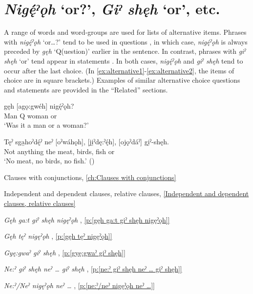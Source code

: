\section{\textit{Nigę́ˀǫh} ‘or?’, \textit{Giˀ shęh} ‘or’, etc.}\label{ch:[nigę́ˀǫh] ‘or?’, [giˀ shęh] ‘or’, etc}
A range of words and word-groups are used for lists of alternative items. Phrases with \textit{nigę́ˀǫh} ‘or…?’ tend to be used in questions , in which case, \textit{nigę́ˀǫh} is always preceded by \textit{gęh} ‘Q(uestion)’ earlier in the sentence. In contrast, phrases with \textit{giˀ shęh} ‘or’ tend appear in statements . In both cases, \textit{nigę́ˀǫh} and \textit{giˀ shęh} tend to occur after the last choice. (In \ref{ex:alternative1}-\ref{ex:alternative2}, the items of choice are in square brackets.) Examples of similar alternative choice questions and statements are provided in the “Related” sections.

\ea\label{ex:alternative1}
\gll [Hǫ:gwéh] gęh [agǫ:gwéh] nigę́ˀǫh? \\
Man Q woman or\\
\glt ‘Was it a man or a woman?’
\z

\ea\label{ex:alternative2}
\gll Tęˀ sga̱hoˀdę́ˀ neˀ [oˀwáhǫh], [ji̱ˀdę:ˀę́h], [ojǫˀdáˀ] gi̱ˀ-shęh.\\
Not anything the meat, birds, fish or \\
\glt ‘No meat, no birds, no fish.’ (\cite{carrier_legends_2013})
\z

\begin{CayugaRelated}
\item Clauses with conjunctions, \ref{ch:Clauses with conjunctions}

\item Independent and dependent clauses, relative clauses, \ref{Independent and dependent clauses, relative clauses}

\item{} \textit{Gęh ga:t giˀ shęh nigęˀǫh} , \ref{p:[gęh ga:t giˀ shęh nigęˀǫh]}

\item{} \textit{Gęh tęˀ nigęˀǫh} , \ref{p:[gęh tęˀ nigęˀǫh]}

\item{} \textit{Gyę:gwaˀ giˀ shęh} , \ref{p:[gyę:gwaˀ giˀ shęh]}

\item{} \textit{Ne:ˀ giˀ shęh neˀ … giˀ shęh} , \ref{p:[ne:ˀ giˀ shęh neˀ … giˀ shęh]}

\item{} \textit{Ne:ˀ/Neˀ nigęˀǫh neˀ …} , \ref{p:[ne:ˀ/neˀ nigęˀǫh neˀ …]}


\end{CayugaRelated}

